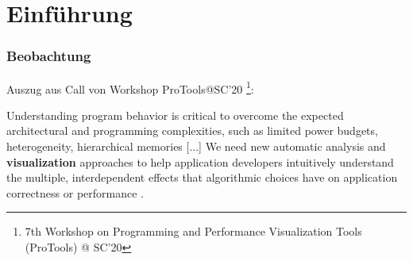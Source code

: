 \documentclass{presentation}
\begin{document}
\begin{frame}
    \titlepage
\end{frame}

\section{Einführung}

\begin{frame}
	\frametitle{Beobachtung}
	Auszug aus Call von Workshop ProTools@SC'20 \footnote{7th Workshop on Programming and Performance Visualization Tools (ProTools) @ SC'20}:\\
	
	\bigskip
	
	Understanding program behavior is critical to overcome the expected architectural and programming complexities, such as limited power budgets, heterogeneity, hierarchical memories [...] We need new automatic analysis and \textbf{visualization} approaches to help application developers intuitively understand the multiple, interdependent effects that algorithmic choices have on application correctness or performance .
\end{frame}
\end{document}

